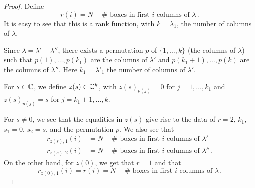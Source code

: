 \documentclass[draft]{article}
\begin{document}
\begin{proof}


Define 
$$r(i) = N - \#\text{~boxes in first $i$ columns of }\lambda\,.$$
It is easy to see that this is a rank function, with $ k = \lambda_1$, the number of columns of $ \lambda$.

Since $\lambda = \lambda' + \lambda''$, there exists a permutation $ p $ of $ \{1, \dots, k\}$ (the columns of $ \lambda$) such that $ p(1), \dots, p(k_1) $ are the columns of $ \lambda'$ and $ p(k_1+1), \dots, p(k)$ are the columns of $ \lambda''$. Here $ k_1 = \lambda'_1$ the number of columns of $ \lambda'$.

For $ s \in \mathbb C$, we define $ z(s) \in \mathbb C^k$, with $ z(s)_{p(j)} = 0 $ for $ j = 1, \dots, k_1 $ and $ z(s)_{p(j)} = s $ for $ j = k_1 + 1, \dots, k$.

For $ s \ne 0$, we see that the equalities in $ z(s) $ give rise to the data of $ r = 2$, $k_1$, $s_1 = 0$, $s_2 = s$, and the permutation $p $.  We also see that
\begin{equation} 
    \label{eq:rcols}
\begin{split}
        r_{z(s), 1}(i) &=  N - \#\text{~boxes in first $i$ columns of }\lambda' \\
        r_{z(s), 2}(i) &=  N - \#\text{~boxes in first $i$ columns of }\lambda'' \,. 
\end{split}
\end{equation}
On the other hand, for $z(0)$, we get that $ r = 1$ and that 
\begin{equation} \label{eq:rcol2}
r_{z(0),1}(i) = r(i) = 
 N - 
     \#\text{~boxes in first $i$ columns of }\lambda\,. 
\end{equation}


\end{proof}
\end{document}
